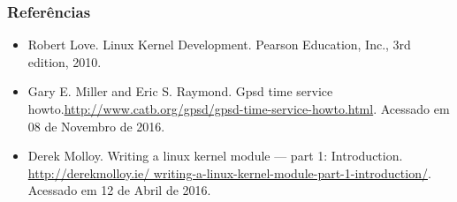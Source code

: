 \documentclass{beamer}
\begin{document}
\begin{frame}
\frametitle{Referências}
{\small
\begin{itemize}
\item Robert Love. Linux Kernel Development. Pearson Education, Inc., 3rd
edition, 2010.
\item Gary E. Miller and Eric S. Raymond.
Gpsd time service
howto.\url{http://www.catb.org/gpsd/gpsd-time-service-howto.html}. Acessado em 08 de Novembro de 2016.
\item Derek Molloy. Writing a linux kernel module — part 1: Introduction.
\url{http://derekmolloy.ie/ writing-a-linux-kernel-module-part-1-introduction/}. 
Acessado em 12 de Abril de 2016.
\end{itemize}
}

\end{frame}
\end{document}
